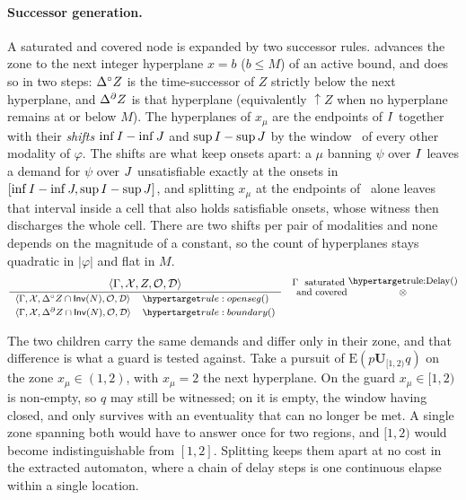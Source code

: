 \paragraph{Successor generation.}
A saturated and covered node is expanded by two successor rules.%
 advances the zone to the next integer hyperplane $x=b$ ($b\le M$) of an active bound,
and does so in two steps: $\Delta^{\circ} Z$ is the time-successor of $Z$ strictly below the next
hyperplane, and $\Delta^{\partial} Z$ is that hyperplane (equivalently $\uparrow Z$ when no hyperplane remains at or
below $M$). The hyperplanes of $x_\mu$ are the endpoints of $I$ together with their
\emph{shifts} $\inf I-\inf J$ and $\sup I-\sup J$ by the window \kJ\ of every other modality of
$\varphi$. The shifts are what keep onsets apart: a $\mu$ banning $\psi$ over $I$ leaves a demand
for $\psi$ over $J$ unsatisfiable exactly at the onsets in $[\inf I-\inf J,\sup I-\sup J]$, and
splitting $x_\mu$ at the endpoints of \kI\ alone leaves that interval inside a cell that also holds
satisfiable onsets, whose witness then discharges the whole cell. There are two shifts per pair of
modalities and none depends on the magnitude of a constant, so the count of hyperplanes stays
quadratic in $|\varphi|$ and flat in $M$. %
\vspace{-0.2cm}
\[
\footnotesize
 \frac{\tup{\Gamma}{\Ctx}{Z}{\obligations}{\Deadline}}
{\begin{array}{ll}
\tup{\Gamma}{\Ctx}{\Dopen Z\cap\Inv(N)}{\obligations}{\Deadline} & \ruleanchor{openseg}\\[2pt]
\tup{\Gamma}{\Ctx}{\Dbd Z\cap\Inv(N)}{\obligations}{\Deadline} & \ruleanchor{boundary}
\end{array}}
\quad  \shortstack{$\Gamma$ \text{ saturated }\\ \text { and covered}}
\shortstack{\ruleanchor{Delay}\\ \ANDn }
\]

The two children carry the same demands and differ only in their zone, and that difference is
what a guard is tested against. Take a pursuit of $\mathrm{E}(p\mathbf{U}_{[1,2)}q)$ on the
zone $x_\mu\in(1,2)$, with $x_\mu=2$ the next hyperplane. On  the
 guard $x_\mu\in[1,2)$ is non-empty, so $q$ may still be witnessed; on  it is empty, the window having closed, and only  survives with an
eventuality that can no longer be met. A single zone spanning both would have to answer once
for two regions, and $[1,2)$ would become indistinguishable from $[1,2]$. Splitting keeps them
apart at no cost in the extracted automaton, where a chain of delay steps is one continuous
elapse within a single location.

